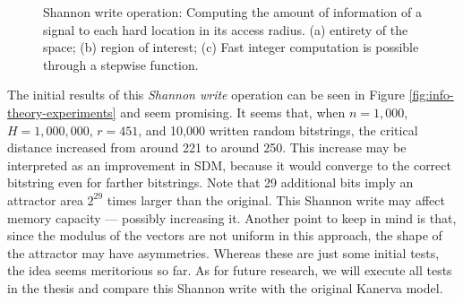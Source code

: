 \begin{figure}[h!]
  \caption{Shannon write operation:  Computing the amount of information of a signal to each hard location in its access radius. (a) entirety of the space; (b) region of interest; (c) Fast integer computation is possible through a stepwise function.}
  \label{fig:info-theory-hypothesis}
\end{figure}


The initial results of this \emph{Shannon write} operation can be seen in Figure \ref{fig:info-theory-experiments} and seem promising. It seems that, when $n=1,000$, $H=1,000,000$, $r=451$, and 10,000 written random bitstrings, the critical distance increased from around 221 to around 250. This increase may be interpreted as an improvement in SDM, because it would converge to the correct bitstring even for farther bitstrings. Note that 29 additional bits imply an attractor area $2^{29}$ times larger than the original. This Shannon write may affect memory capacity \citep{chou_capacity_1989, chou_capacity_1988, sjodin_improving_1995} --- possibly increasing it. Another point to keep in mind is that, since the modulus of the vectors are not uniform in this approach, the shape of the attractor may have asymmetries. Whereas these are just some initial tests, the idea seems meritorious so far.  As for future research, we will execute all tests in the thesis and compare this Shannon write with the original Kanerva model.





